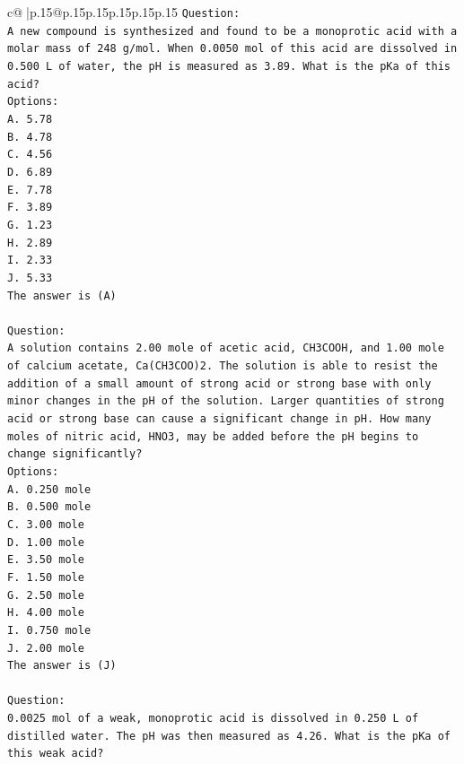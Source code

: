 \documentclass{article}
\begin{document}
{\begin{supertabular}{c@{$\;$}|p{.15\linewidth}@{}p{.15\linewidth}p{.15\linewidth}p{.15\linewidth}p{.15\linewidth}p{.15\linewidth}}
{{{\texttt{Question:} \\
\texttt{A new compound is synthesized and found to be a monoprotic acid with a molar mass of 248 g/mol. When 0.0050 mol of this acid are dissolved in 0.500 L of water, the pH is measured as 3.89. What is the pKa of this acid?} \\
\texttt{Options:} \\
\texttt{A. 5.78} \\
\texttt{B. 4.78} \\
\texttt{C. 4.56} \\
\texttt{D. 6.89} \\
\texttt{E. 7.78} \\
\texttt{F. 3.89} \\
\texttt{G. 1.23} \\
\texttt{H. 2.89} \\
\texttt{I. 2.33} \\
\texttt{J. 5.33} \\
\texttt{The answer is (A)} \\
\\ 
\texttt{Question:} \\
\texttt{A solution contains 2.00 mole of acetic acid, CH3COOH, and 1.00 mole of calcium acetate, Ca(CH3COO)2. The solution is able to resist the addition of a small amount of strong acid or strong base with only minor changes in the pH of the solution. Larger quantities of strong acid or strong base can cause a significant change in pH. How many moles of nitric acid, HNO3, may be added before the pH begins to change significantly?} \\
\texttt{Options:} \\
\texttt{A. 0.250 mole} \\
\texttt{B. 0.500 mole} \\
\texttt{C. 3.00 mole} \\
\texttt{D. 1.00 mole} \\
\texttt{E. 3.50 mole} \\
\texttt{F. 1.50 mole} \\
\texttt{G. 2.50 mole} \\
\texttt{H. 4.00 mole} \\
\texttt{I. 0.750 mole} \\
\texttt{J. 2.00 mole} \\
\texttt{The answer is (J)} \\
\\ 
\texttt{Question:} \\
\texttt{0.0025 mol of a weak, monoprotic acid is dissolved in 0.250 L of distilled water. The pH was then measured as 4.26. What is the pKa of this weak acid?} \\
}}}
\end{supertabular}}
\end{document}
